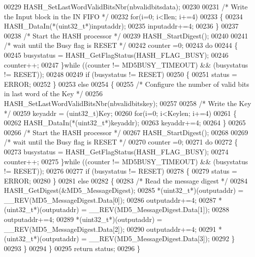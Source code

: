 \begin{DoxyCode}
00229     HASH_SetLastWordValidBitsNbr(nbvalidbitsdata);
00230 
00231     \textcolor{comment}{/* Write the Input block in the IN FIFO */}
00232     \textcolor{keywordflow}{for}(i=0; i<Ilen; i+=4)
00233     \{
00234       HASH_DataIn(*(uint32\_t*)inputaddr);
00235       inputaddr+=4;
00236     \}
00237 
00238     \textcolor{comment}{/* Start the HASH processor */}
00239     HASH_StartDigest();
00240 
00241     \textcolor{comment}{/* wait until the Busy flag is RESET */}
00242     counter =0;
00243     \textcolor{keywordflow}{do}
00244     \{
00245        busystatus = HASH_GetFlagStatus(HASH_FLAG_BUSY);
00246        counter++;
00247     \}\textcolor{keywordflow}{while} ((counter != MD5BUSY_TIMEOUT) && (busystatus != RESET));
00248 
00249     \textcolor{keywordflow}{if} (busystatus != RESET)
00250     \{
00251       status = ERROR;
00252     \}
00253     \textcolor{keywordflow}{else}
00254     \{  
00255       \textcolor{comment}{/* Configure the number of valid bits in last word of the Key */}
00256       HASH_SetLastWordValidBitsNbr(nbvalidbitskey);
00257 
00258       \textcolor{comment}{/* Write the Key */}
00259       keyaddr = (uint32\_t)Key;
00260       \textcolor{keywordflow}{for}(i=0; i<Keylen; i+=4)
00261       \{
00262         HASH_DataIn(*(uint32\_t*)keyaddr);
00263         keyaddr+=4;
00264       \}
00265   
00266        \textcolor{comment}{/* Start the HASH processor */}
00267        HASH_StartDigest();
00268 
00269        \textcolor{comment}{/* wait until the Busy flag is RESET */}
00270        counter =0;
00271        \textcolor{keywordflow}{do}
00272        \{
00273           busystatus = HASH_GetFlagStatus(HASH_FLAG_BUSY);
00274           counter++;
00275       \}\textcolor{keywordflow}{while} ((counter != MD5BUSY_TIMEOUT) && (busystatus != RESET));
00276 
00277       \textcolor{keywordflow}{if} (busystatus != RESET)
00278       \{
00279          status = ERROR;
00280       \}
00281       \textcolor{keywordflow}{else}
00282       \{
00283          \textcolor{comment}{/* Read the message digest */}
00284          HASH_GetDigest(&MD5\_MessageDigest);
00285          *(uint32\_t*)(outputaddr)  = \_\_REV(MD5\_MessageDigest.Data[0]);
00286          outputaddr+=4;
00287          *(uint32\_t*)(outputaddr)  = \_\_REV(MD5\_MessageDigest.Data[1]);
00288          outputaddr+=4;
00289          *(uint32\_t*)(outputaddr)  = \_\_REV(MD5\_MessageDigest.Data[2]);
00290          outputaddr+=4;
00291          *(uint32\_t*)(outputaddr)  = \_\_REV(MD5\_MessageDigest.Data[3]);
00292       \}
00293     \}
00294   \}
00295   \textcolor{keywordflow}{return} status;  
00296 \}
\end{DoxyCode}

